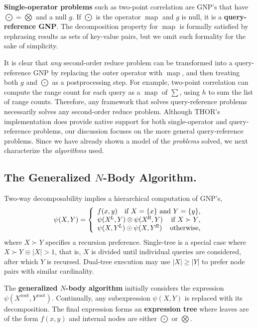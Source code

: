 \documentclass[twoside,leqno,twocolumn]{article}
\newcommand{\prefsplit}[2]{#1 \succ #2}
\DeclareMathOperator*{\map}{map}
\newcommand{\gnp}{\psi}
\newcommand{\mysub}[1]{\subsection{#1.}}
\newcommand{\defterm}[1]{{\bf #1}}
\newcommand{\kdroot}[1]{#1^{\text{root}}}
\newcommand{\kdleft}[1]{#1^{\!L}}
\newcommand{\kdright}[1]{#1^{\!R}}
\begin{document}
\defterm{Single-operator problems} such as two-point correlation are GNP's that have $\bigodot = \bigotimes$ and a null $g$.
If $\bigodot$ is the operator $\map$ and $g$ is null, it is a \defterm{query-reference GNP}.
The decomposition property for $\map$ is formally satisfied by rephrasing results as sets of key-value pairs, but we omit such formality for the sake of simplicity.

It is clear that {\em any} second-order reduce problem can be transformed into a query-reference GNP by replacing the outer operator with $\map$, and then treating both $g$ and $\bigodot$ as a postprocessing step.
For example, two-point correlation can compute the range count for each query as a $\map$ of $\sum$, using $h$ to sum the list of range counts.
Therefore, any framework that solves query-reference problems necessarily solves any second-order reduce problem.
Although THOR's implementation does provide native support for both single-operator and query-reference problems, our discussion focuses on the more general query-reference problems.
Since we have already shown a model of the {\it problems} solved, we next characterize the {\it algorithms} used.

\mysub{The Generalized $N$-Body Algorithm}
Two-way decomposability implies a hierarchical computation of GNP's,
\[
\gnp(X,Y) = \left\{ \begin{array}{lrr}
    f(x,y) & \multicolumn{2}{r}{\text{if }X = \{x\}\text{ and }Y = \{y\}\text{,}}
    \\
    \multicolumn{2}{l}{\gnp(\kdleft{X},Y) \otimes \gnp(\kdright{X}, Y)} & \text{if }\prefsplit{X}{Y}\text{,}
    \\
    \multicolumn{2}{l}{\gnp(X,\kdleft{Y}) \odot \gnp(X,\kdright{Y})} & \text{otherwise,}
  \end{array}
\right.
\]
\noindent
where $\prefsplit{X}{Y}$ specifies a recursion preference.
Single-tree is a special case where $\prefsplit{X}{Y} \equiv |X| > 1$, that is, $X$ is divided until individual queries are considered, after which $Y$ is recursed.
Dual-tree execution may use $|X| \geq |Y|$ to prefer node pairs with similar cardinality.

The \defterm{generalized $N$-body algorithm} initially considers the expression $\gnp(\kdroot{X}, \kdroot{Y})$.
Continually, any subexpression $\gnp(X, Y)$ is replaced with its decomposition.
The final expression forms an \defterm{expression tree} where leaves are of the form $f(x,y)$ and internal nodes are either $\bigodot$ or $\bigotimes$.
\end{document}
